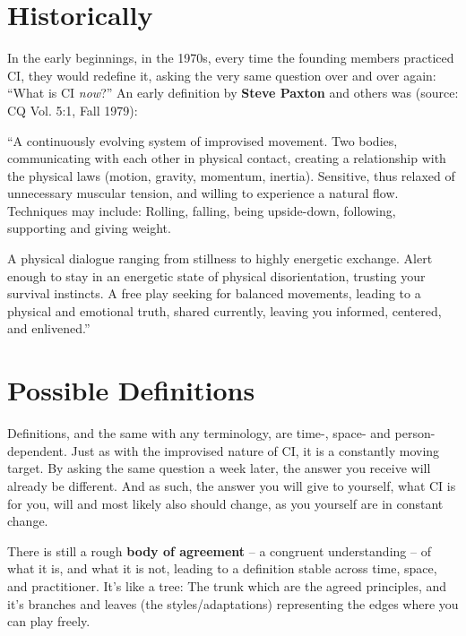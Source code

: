 \section{Historically}\label{sec:historically}

In the early beginnings, in the 1970s, every time the founding members practiced CI, they would redefine it, asking the very same question over and over again: ``What is CI \textit{now}?'' An early definition by \textbf{Steve Paxton} and others was (source: CQ Vol. 5:1, Fall 1979):

\begin{displayquote}
	``A continuously evolving system of improvised movement.
	Two bodies, communicating with each other in physical contact, creating a relationship with the physical laws (motion, gravity, momentum, inertia).
	Sensitive, thus relaxed of unnecessary muscular tension, and willing to experience a natural flow.
	Techniques may include: Rolling, falling, being upside-down, following, supporting and giving weight.

	A physical dialogue ranging from stillness to highly energetic exchange.
	Alert enough to stay in an energetic state of physical disorientation, trusting your survival instincts.
	A free play seeking for balanced movements, leading to a physical and emotional truth, shared currently, leaving you informed, centered, and enlivened.''
\end{displayquote}

\section{Possible Definitions}\label{sec:possible-definitions}

Definitions, and the same with any terminology, are time-, space- and person-dependent.
Just as with the improvised nature of CI, it is a constantly moving target.
By asking the same question a week later, the answer you receive will already be different.
And as such, the answer you will give to yourself, what CI is for you, will and most likely also should change, as you yourself are in constant change.

There is still a rough \textbf{body of agreement} -- a congruent understanding -- of what it is, and what it is not, leading to a definition stable across time, space, and practitioner.
It's like a tree: The trunk which are the agreed principles, and it's branches and leaves (the styles/adaptations) representing the edges where you can play freely.

